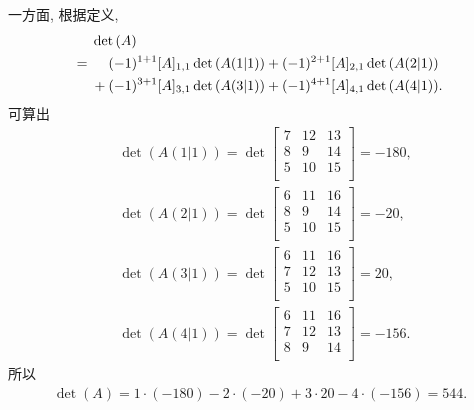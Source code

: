 \begin{example}
    一方面,
    根据定义,
    \begin{align*}
             & \det {(A)} \\
        = {} &
        \hphantom{{} + {}}
        (-1)^{1+1} [A]_{1,1} \det {(A(1|1))}
        + (-1)^{2+1} [A]_{2,1} \det {(A(2|1))}
        \\
             &
        + (-1)^{3+1} [A]_{3,1} \det {(A(3|1))}
        + (-1)^{4+1} [A]_{4,1} \det {(A(4|1))}.
    \end{align*}
    可算出
    \begin{align*}
         & \det {(A(1|1))}
        = \det {\begin{bmatrix}
                        7 & 12 & 13 \\
                        8 & 9  & 14 \\
                        5 & 10 & 15 \\
                    \end{bmatrix}}
        = -180,            \\
         & \det {(A(2|1))}
        = \det {\begin{bmatrix}
                        6 & 11 & 16 \\
                        8 & 9  & 14 \\
                        5 & 10 & 15 \\
                    \end{bmatrix}}
        = -20,             \\
         & \det {(A(3|1))}
        = \det {\begin{bmatrix}
                        6 & 11 & 16 \\
                        7 & 12 & 13 \\
                        5 & 10 & 15 \\
                    \end{bmatrix}}
        = 20,              \\
         & \det {(A(4|1))}
        = \det {\begin{bmatrix}
                        6 & 11 & 16 \\
                        7 & 12 & 13 \\
                        8 & 9  & 14 \\
                    \end{bmatrix}}
        = -156.
    \end{align*}
    所以
    \begin{align*}
        \det {(A)}
        = 1 \cdot (-180) - 2 \cdot (-20)
        + 3 \cdot 20 - 4 \cdot (-156)
        = 544.
    \end{align*}


\end{example}
